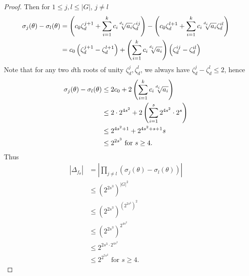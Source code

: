 \begin{proof}
Then for $1\leq j, l\leq |G|$, $j \neq l$
\begin{align*}
    \sigma_j(\theta) - \sigma_l(\theta)
    &= \left(c_0 \zeta_d^{j+1} + \sum_{i=1}^k c_i \mysqrt{d_i}{a_i} \zeta_d^{ij}\right) - \left(c_0 \zeta_d^{l+1} + \sum_{i=1}^k c_i \mysqrt{d_i}{a_i} \zeta_d^{il}\right) \\
    &= c_0\left(\zeta_d^{j+1} - \zeta_d^{l+1}\right) + \left(\sum_{i=1}^k c_i \mysqrt{d_i}{a_i}\right)\left(\zeta_d^{ij} - \zeta_d^{il}\right)
\end{align*}
Note that for any two $d$th roots of unity $\zeta_d^j, \zeta_d^l$, we always have $\zeta_d^j - \zeta_d^l \leq 2$, hence
\begin{align*}
    \sigma_j(\theta) - \sigma_l(\theta)
    &\leq 2c_0 + 2\left(\sum_{i=1}^k c_i \mysqrt{d_i}{a_i}\right) \\
    &\leq 2\cdot 2^{4s^2} + 2 \left(\sum_{i=1}^s 2^{4s^2} \cdot 2^s\right) \\
    &\leq 2^{4s^2 + 1} + 2^{4s^2+s+1}s \\
    &\leq 2^{2s ^ 3} \text{ for } s\geq 4.
\end{align*}
Thus
\begin{align*}
    |\Delta_{f_\theta}| &= |\prod_{j\neq l} (\sigma_j(\theta) - \sigma_l(\theta))| \\
    &\leq \left(2^{2s^3}\right)^{|G|^2} \\
    &\leq \left(2^{2s^3}\right)^{\left(2^{2s^2}\right)^2} \\
    &\leq \left(2^{2s^3}\right)^{2^{4s^2}} \\
    &\leq 2^{2s^3 \cdot 2^{4s^2}} \\
    &\leq 2^{2^{5s^2}} \text{ for } s\geq 4.
\end{align*}
\end{proof}